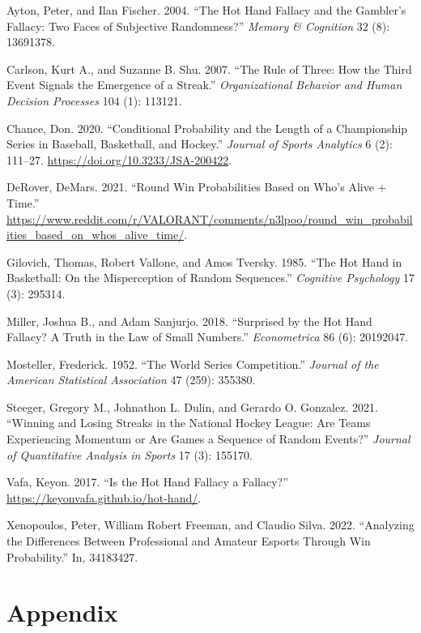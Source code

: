 \documentclass{article}
\newlength{\cslhangindent}
\newlength{\cslentryspacingunit} %
\newenvironment{CSLReferences}[2] %
 {%
  \setlength{\parindent}{0pt}
  \ifodd #1
  \let\oldpar\par
  \def\par{\hangindent=\cslhangindent\oldpar}
  \fi
  \setlength{\parskip}{#2\cslentryspacingunit}
 }%
 {}
\begin{document}
\hypertarget{refs}{}
\begin{CSLReferences}{1}{0}
\leavevmode{}%
Ayton, Peter, and Ilan Fischer. 2004. {``The Hot Hand Fallacy and the
Gambler{'}s Fallacy: Two Faces of Subjective Randomness?''} \emph{Memory
\& Cognition} 32 (8): 13691378.

\leavevmode{}%
Carlson, Kurt A., and Suzanne B. Shu. 2007. {``The Rule of Three: How
the Third Event Signals the Emergence of a Streak.''}
\emph{Organizational Behavior and Human Decision Processes} 104 (1):
113121.

\leavevmode{}%
Chance, Don. 2020. {``Conditional Probability and the Length of a
Championship Series in Baseball, Basketball, and Hockey.''}
\emph{Journal of Sports Analytics} 6 (2): 111--27.
\url{https://doi.org/10.3233/JSA-200422}.

\leavevmode{}%
DeRover, DeMars. 2021. {``Round Win Probabilities Based on Who's Alive +
Time.''}
\url{https://www.reddit.com/r/VALORANT/comments/n3lpoo/round_win_probabilities_based_on_whos_alive_time/}.

\leavevmode{}%
Gilovich, Thomas, Robert Vallone, and Amos Tversky. 1985. {``The Hot
Hand in Basketball: On the Misperception of Random Sequences.''}
\emph{Cognitive Psychology} 17 (3): 295314.

\leavevmode{}%
Miller, Joshua B., and Adam Sanjurjo. 2018. {``Surprised by the Hot Hand
Fallacy? A Truth in the Law of Small Numbers.''} \emph{Econometrica} 86
(6): 20192047.

\leavevmode{}%
Mosteller, Frederick. 1952. {``The World Series Competition.''}
\emph{Journal of the American Statistical Association} 47 (259): 355380.

\leavevmode{}%
Steeger, Gregory M., Johnathon L. Dulin, and Gerardo O. Gonzalez. 2021.
{``Winning and Losing Streaks in the National Hockey League: Are Teams
Experiencing Momentum or Are Games a Sequence of Random Events?''}
\emph{Journal of Quantitative Analysis in Sports} 17 (3): 155170.

\leavevmode{}%
Vafa, Keyon. 2017. {``Is the Hot Hand Fallacy a Fallacy?''}
\url{https://keyonvafa.github.io/hot-hand/}.

\leavevmode{}%
Xenopoulos, Peter, William Robert Freeman, and Claudio Silva. 2022.
{``Analyzing the Differences Between Professional and Amateur Esports
Through Win Probability.''} In, 34183427.

\end{CSLReferences}

\hypertarget{appendix}{%
\section*{Appendix}\label{appendix}}



\end{document}
